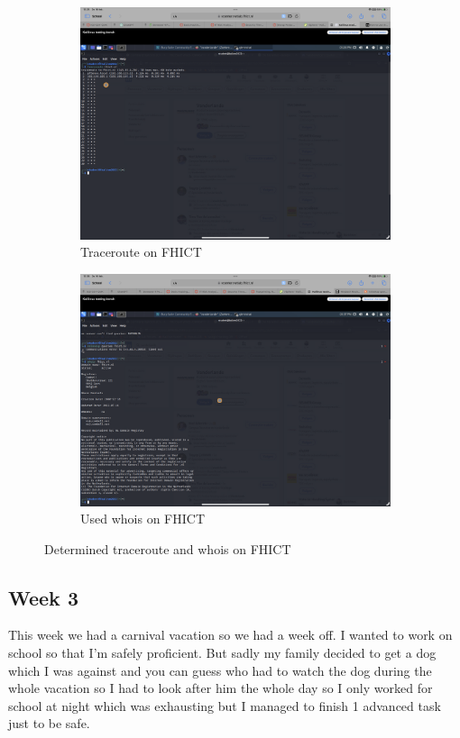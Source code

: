 \documentclass[12pt, letterpaper]{article}
\begin{document}
\newpage
\begin{figure}[!ht]
    \begin{subfigure}{0.45\textwidth}
        \centering
        \includegraphics[width=0.9\linewidth]{PDFs/Week 2/Trace route fhict.png}
        \caption{Traceroute on FHICT}
    \end{subfigure}
    \begin{subfigure}{0.45\textwidth}
        \centering
        \includegraphics[width=0.9\linewidth]{PDFs/Week 2/Whois fhict.png}
        \caption{Used whois on FHICT}
    \end{subfigure}
    \caption{Determined traceroute and whois on FHICT}
\end{figure}
\newpage
\subsection{Week 3}
This week we had a carnival vacation so we had a week off. I wanted to work on school so that I'm safely proficient. But sadly my family decided to get a dog which I was against and you can guess who had to watch the dog during the whole vacation so I had to look after him the whole day so I only worked for school at night which was exhausting but I managed to finish 1 advanced task just to be safe.
\end{document}
